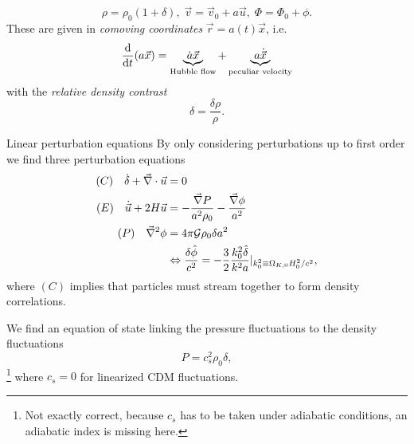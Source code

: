 \begin{equation}
	\rho = \rho_0 (1+\delta), \; \vec{v}=\vec{v}_0+a \vec{u}, \; \Phi=\Phi_0+\phi.
\end{equation}
These are given in \emph{comoving coordinates} $\vec{r}=a(t) \vec{x}$, i.e.
\begin{equation*}
	\frac{\mathrm{d}}{\mathrm{d} t}(a \vec{x}) = \underbrace{\dot{a} \vec{x}}_{\text{Hubble flow}} + \underbrace{a \dot{\vec{x}}}_{\text{peculiar velocity}}
\end{equation*}
with the \emph{relative density contrast}
\begin{equation}
	\label{eq:densitycontrast}
	\delta = \frac{\delta \rho}{\rho}.
\end{equation}
\begin{mybox}{Linear perturbation equations}
	By only considering perturbations up to first order we find three perturbation equations
	\begin{align}
		(C) \quad \dot{\delta}+\vec{\nabla}\cdot \vec{u} &=0\\
		(E) \quad \dot{\vec{u}} + 2 H \vec{u} &= - \frac{\vec{\nabla}P}{a^2 \rho_0} - \frac{\vec{\nabla}\phi}{a^2} \\
		(P) \quad \vec{\nabla}^2 \phi &= 4 \pi \mathcal{G} \rho_0 \delta a^2\\
		&\Leftrightarrow \frac{\delta \hat{\phi}}{c^2}=-\frac{3}{2} \frac{k^2_0\hat{\delta}}{k^2 a} |_{k^2_0\equiv\Omega_{K,0}H^2_0/c^2},
	\end{align}
where $(C)$ implies that particles must stream together to form density correlations.
\end{mybox}
We find an equation of state linking the pressure fluctuations to the density fluctuations
\begin{equation}
	 P=c^2_s \rho_0 \delta,
\end{equation}
\footnote{Not exactly correct, because $c_s$ has to be taken under adiabatic conditions, an adiabatic index is missing here.}
where $c_s=0$ for linearized CDM fluctuations.

